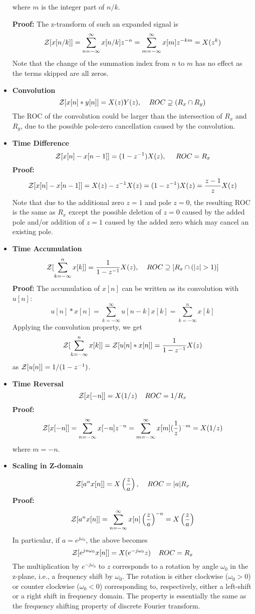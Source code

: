 \begin{itemize}
where $m$ is the integer part of $n/k$. 

{\bf Proof: } The z-transform of such an expanded signal is
\[	{\cal Z}[x[n/k]]=\sum_{n=-\infty}^\infty x[n/k]z^{-n}	
	=\sum_{m=-\infty}^\infty x[m]z^{-km}=X(z^k)	\]
Note that the change of the summation index from $n$ to $m$ has no effect as the 
terms skipped are all zeros.

\item {\bf Convolution}
\[	{\cal Z}[x[n]*y[n]]=X(z) Y(z), \;\;\;\;ROC \supseteq (R_x \cap R_y) \]
The ROC of the convolution could be larger than the intersection of $R_x$ and
$R_y$, due to the possible pole-zero cancellation caused by the convolution.

\item {\bf Time Difference}
\[	{\cal Z}[x[n]-x[n-1]]=(1-z^{-1})X(z), \;\;\;\;\;ROC=R_x  	\]
{\bf Proof: } 
\[	
{\cal Z}[x[n]-x[n-1]]=X(z)-z^{-1}X(z)=(1-z^{-1})X(z)=\frac{z-1}{z}X(z)
\]
Note that due to the additional zero $z=1$ and pole $z=0$, the resulting ROC 
is the same as $R_x$ except the possible deletion of $z=0$ caused by the added
pole and/or addition of $z=1$ caused by the added zero which may cancel an 
existing pole.

\item {\bf Time Accumulation}
\[	{\cal Z}[\sum_{k=-\infty}^nx[k]]=\frac{1}{1-z^{-1}}X(z),
	\;\;\;\;ROC \supseteq [R_x \cap (|z|>1)]	\]	
{\bf Proof: } The accumulation of $x[n]$ can be written as its convolution with $u[n]$:
\[
u[n]*x[n]=\sum_{k=-\infty}^\infty u[n-k]x[k]=\sum_{k=-\infty}^n x[k]
\]
Applying the convolution property, we get
\[
{\cal Z}[\sum_{k=-\infty}^nx[k]]={\cal Z}[u[n]*x[n]]=\frac{1}{1-z^{-1}}X(z)
\]
as ${\cal Z}[u[n]]=1/(1-z^{-1})$.

\item {\bf Time Reversal}
\[	{\cal Z}[x[-n]]=X(1/z)\;\;\;\;ROC=1/R_x	\]
{\bf Proof: }
\[	{\cal Z}[x[-n]]=\sum_{n=-\infty}^\infty x[-n]z^{-n}	
	=\sum_{m=-\infty}^\infty x[m](\frac{1}{z})^{-m}=X(1/z)
\]
where $m=-n$.

\item {\bf Scaling in Z-domain}

\[	{\cal Z}[a^n x[n]]=X\left(\frac{z}{a}\right),\;\;\;\;ROC=|a|R_x	\]
{\bf Proof: }
\[	{\cal Z}[a^n x[n]]=\sum_{n=-\infty}^\infty x[n]\left(\frac{z}{a} \right)^{-n}
	=X\left(\frac{z}{a}\right)
\]
In particular, if $a=e^{j\omega_0}$, the above becomes
\[	{\cal Z}[e^{jn\omega_0} x[n]]=X(e^{-j\omega_0}z)\;\;\;\;ROC=R_x	\]
The multiplication by $e^{-j\omega_0}$ to $z$ corresponds to a rotation by 
angle $\omega_0$ in the z-plane, i.e., a frequency shift by $\omega_0$.
The rotation is either clockwise ($\omega_0>0$) or counter clockwise 
($\omega_0<0$) corresponding to, respectively, either a left-shift or a
right shift in frequency domain. The property is essentially the same as 
the frequency shifting property of discrete Fourier transform. 


\end{itemize}
